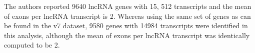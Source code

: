 \documentclass[ncrna,article,submit,moreauthors,pdftex,10pt,a4paper]{mdpi}
\begin{document}
The authors reported 9640 lncRNA genes with 15, 512 transcripts and the mean of exons per lncRNA transcript is 2.
Whereas using the same set of genes as can be found in the v7 dataset, 9580 genes with 14984 transcripts were identified in this analysis, although 
the mean of exons per lncRNA transcript was identically computed to be 2.
\begin{figure}[h]
\end{figure}
\end{document}

